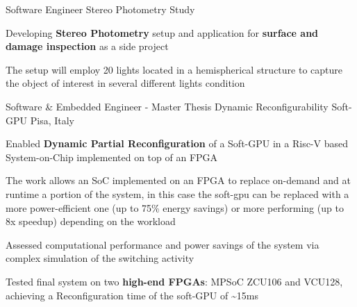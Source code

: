 

\begin{cventries}

  \cventry
    {Software Engineer} %
    {Stereo Photometry Study} %
    {} %
    {} %
    {
      \begin{cvitems} %
        \item {Developing \textbf{Stereo Photometry} setup and application for \textbf{surface and damage inspection} as a side project}
        \item {The setup will employ 20 lights located in a hemispherical structure to capture the object of interest in several different lights condition}
      \end{cvitems}
    }

  \cventry
    {Software \& Embedded Engineer - Master Thesis} %
    {Dynamic Reconfigurability Soft-GPU} %
    {Pisa, Italy} %
    {} %
    {
      \begin{cvitems} %
        \item {Enabled \textbf{Dynamic Partial Reconfiguration} of a Soft-GPU in a Risc-V based System-on-Chip implemented on top of an FPGA}
        \item {The work allows an SoC implemented on an FPGA to replace on-demand and at runtime a portion of the system, in this case the soft-gpu can be replaced with a more power-efficient one (up to 75\% energy savings) or more performing (up to 8x speedup) depending on the workload}
        \item {Assessed computational performance and power savings of the system via complex simulation of the switching activity}
        \item {Tested final system on two \textbf{high-end FPGAs}: MPSoC ZCU106 and VCU128, achieving a Reconfiguration time of the soft-GPU of \textasciitilde 15ms}
      \end{cvitems}
    }


\end{cventries}
